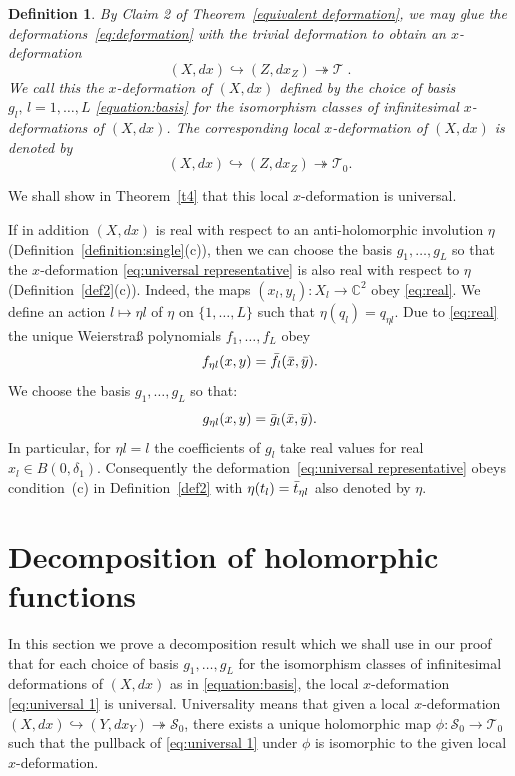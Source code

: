 \documentclass[11pt,twoside]{amsart}
\theoremstyle{plain}
\newtheorem{definition}[theorem]{Definition}
\newcommand{\Tm}{\mathcal{T}}
\newcommand{\dfx}{dx}
\begin{document}
\begin {definition}\label{universal1} %
By Claim 2 of Theorem~\ref{equivalent deformation}, we may glue the deformations~\eqref{eq:deformation} with the trivial deformation to obtain an $x$-deformation 
\begin {equation} (X,\dfx)\hookrightarrow(Z,\dfx_Z)\twoheadrightarrow\Tm \; .  \label{eq:universal representative}
\end {equation}
We call this the $ x $-deformation  of $ (X, \dfx) $ defined by the choice of basis $ g_l,\, l = 1,\ldots , L $ \eqref{equation:basis} for the isomorphism classes of infinitesimal $ x $-deformations of  $ (X, \dfx) $. The corresponding local $ x $-deformation  of $ (X, \dfx) $ is denoted by
\begin{equation} \label{eq:universal 1}
	(X,\dfx)\hookrightarrow(Z,\dfx_Z)\twoheadrightarrow\Tm_0.
\end{equation}
\end{definition}
We shall show in Theorem~\ref{t4} that this local $ x $-deformation is universal.

If in addition $(X,dx)$ is real with respect to an anti-holomorphic involution $\eta$ (Definition~\ref{definition:single}(c)), then we can choose the basis $g_1,\dotsc,g_L$ so that the $x$-deformation \eqref{eq:universal representative} is also real with respect to $\eta$ (Definition~\ref{def2}(c)). Indeed, the maps $(x_l,y_l):X_l\to\mathbb{C}^2$ obey \eqref{eq:real}. We define an action $l\mapsto\eta l$ of $\eta$ on $\{1,\ldots,L\}$ such that $\eta(q_l)=q_{\eta l}$. Due to \eqref{eq:real} the unique Weierstra{\ss} polynomials $f_1,\ldots,f_L$ obey
$$f_{\eta l}(x,y)=\Bar{f}_l(\Bar{x},\Bar{y}).$$
We choose the basis $g_1,\ldots,g_L$ so that:
\begin{equation}\label{eq:real 2}
g_{\eta l}(x,y)=\Bar{g}_l(\Bar{x},\Bar{y}).
\end{equation}
In particular, for $\eta l=l$ the coefficients of $g_l$ take real values for real $x_l\in B(0,\delta_1)$. Consequently the deformation~\eqref{eq:universal representative} obeys condition~(c) in Definition~\ref{def2} with $\eta(t_l)=\Bar{t}_{\eta l}$ also denoted by $\eta$.
\section{Decomposition of holomorphic functions}\label {sec:decomposition}
 In this section we prove a decomposition result which we shall use in our proof that for each choice of basis $g_1,\ldots,g_L$ for the isomorphism classes of infinitesimal deformations of $ (X,\dfx) $ as in  \eqref {equation:basis}, the local $ x $-deformation \eqref{eq:universal 1} is universal. Universality means that given a local $ x $-deformation $(X,\dfx)\hookrightarrow(Y, \dfx_Y)\twoheadrightarrow\mathcal S_0 $,  there exists a unique holomorphic map $\phi:\mathcal S_0\rightarrow\mathcal T_0 $ such that the pullback of  \eqref {eq:universal 1} under $\phi $ is isomorphic to the given local $ x $-deformation.  
\end{document}
